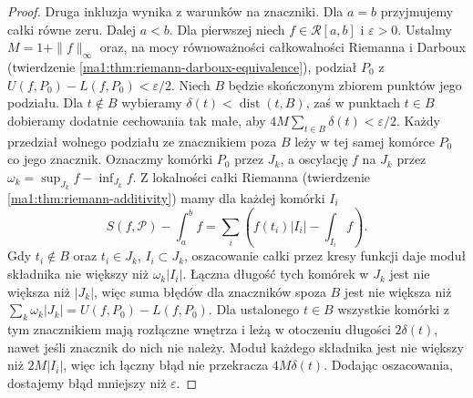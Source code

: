 \begin{proof}
Druga inkluzja wynika z warunków na znaczniki. Dla $a=b$ przyjmujemy całki równe zeru. Dalej $a<b$. Dla pierwszej niech $f\in\mathcal R[a,b]$ i $\varepsilon>0$. Ustalmy $M=1+\|f\|_\infty$ oraz, na mocy równoważności całkowalności Riemanna i Darboux
(twierdzenie \ref{ma1:thm:riemann-darboux-equivalence}), podział $P_0$ z $U(f,P_0)-L(f,P_0)<\varepsilon/2$. Niech $B$ będzie skończonym zbiorem punktów jego podziału. Dla $t\notin B$ wybieramy $\delta(t)<\operatorname{dist}(t,B)$, zaś w punktach $t\in B$ dobieramy dodatnie cechowania tak małe, aby $4M\sum_{t\in B}\delta(t)<\varepsilon/2$. Każdy przedział wolnego podziału ze znacznikiem poza $B$ leży w tej samej komórce $P_0$ co jego znacznik. Oznaczmy komórki $P_0$ przez $J_k$, a oscylację $f$ na $J_k$ przez $\omega_k=\sup_{J_k}f-\inf_{J_k}f$. Z lokalności całki Riemanna (twierdzenie \ref{ma1:thm:riemann-additivity}) mamy dla każdej komórki $I_i$
\[
 S(f,\mathcal P)-\int_a^b f=\sum_i\left(f(t_i)|I_i|-\int_{I_i} f\right).
\]
Gdy $t_i\notin B$ oraz $t_i\in J_k$, $I_i\subset J_k$, oszacowanie całki przez kresy funkcji daje moduł składnika nie większy niż $\omega_k|I_i|$. Łączna długość tych komórek w $J_k$ jest nie większa niż $|J_k|$, więc suma błędów dla znaczników spoza $B$ jest nie większa niż $\sum_k\omega_k|J_k|=U(f,P_0)-L(f,P_0)$. Dla ustalonego $t\in B$ wszystkie komórki z tym znacznikiem mają rozłączne wnętrza i leżą w otoczeniu długości $2\delta(t)$, nawet jeśli znacznik do nich nie należy. Moduł każdego składnika jest nie większy niż $2M|I_i|$, więc ich łączny błąd nie przekracza $4M\delta(t)$. Dodając oszacowania, dostajemy błąd mniejszy niż $\varepsilon$.
\end{proof}

